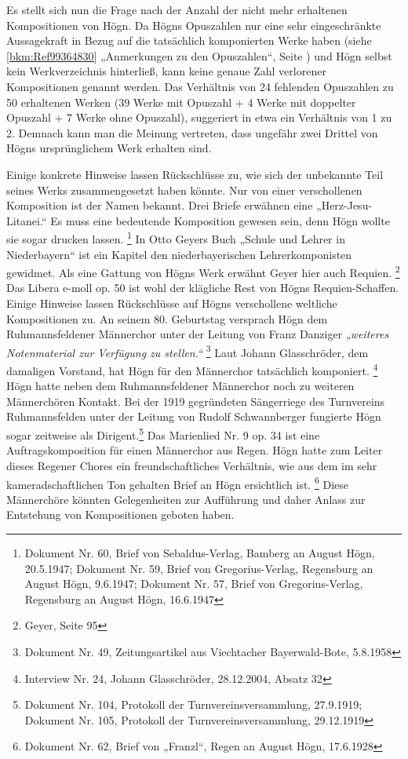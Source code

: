 \documentclass[a4paper]{article}
\newcommand\zitat[1]{\textit{#1}}
\begin{document}
Es stellt sich nun die Frage nach der Anzahl der nicht mehr erhaltenen
Kompositionen von Högn. Da Högns Opuszahlen nur eine sehr
eingeschränkte Aussagekraft in Bezug auf die tatsächlich komponierten
Werke haben (siehe \ref{bkm:Ref99364830} „Anmerkungen zu den
Opuszahlen“, Seite \pageref{bkm:Ref98509933}) und Högn selbst kein
Werkverzeichnis hinterließ, kann keine genaue Zahl verlorener
Kompositionen genannt werden. Das Verhältnis von 24 fehlenden
Opuszahlen zu 50 erhaltenen Werken (39 Werke mit Opuszahl + 4 Werke mit
doppelter Opuszahl + 7 Werke ohne Opuszahl), suggeriert in etwa ein
Verhältnis von 1 zu 2. Demnach kann man die Meinung vertreten, dass
ungefähr zwei Drittel von Högns ursprünglichem Werk erhalten sind.

Einige konkrete Hinweise lassen Rückschlüsse zu, wie sich der unbekannte
Teil seines Werks zusammengesetzt haben könnte. Nur von einer
verschollenen Komposition ist der Namen bekannt. Drei Briefe erwähnen
eine „Herz-Jesu-Litanei.“ Es muss eine bedeutende Komposition gewesen
sein, denn Högn wollte sie sogar drucken lassen.
\footnote{Dokument Nr. 60, Brief von Sebaldus-Verlag, Bamberg an August Högn, 20.5.1947;
Dokument Nr. 59, Brief von Gregorius-Verlag, Regensburg an August Högn, 9.6.1947;
Dokument Nr. 57, Brief von Gregorius-Verlag, Regensburg an August Högn, 16.6.1947}
In Otto
Geyers Buch „Schule und Lehrer in Niederbayern“ ist ein Kapitel den
niederbayerischen Lehrerkomponisten gewidmet. Als eine Gattung von
Högns Werk erwähnt Geyer hier auch Requien. \footnote{Geyer, Seite 95}
Das Libera e-moll op. 50 ist wohl der klägliche Rest von Högns
Requien-Schaffen. Einige Hinweise lassen Rückschlüsse auf Högns
verschollene weltliche Kompositionen zu. An seinem 80. Geburtstag
versprach Högn dem Ruhmannsfeldener Männerchor unter der Leitung von
Franz Danziger \zitat{„weiteres Notenmaterial zur Verfügung
zu stellen.“ } \footnote{Dokument Nr. 49, Zeitungsartikel aus
Viechtacher Bayerwald-Bote, 5.8.1958} Laut Johann Glasschröder, dem
damaligen Vorstand, hat Högn für den Männerchor tatsächlich
komponiert. \footnote{Interview Nr. 24, Johann Glasschröder,
28.12.2004, Absatz 32} Högn hatte neben dem Ruhmannsfeldener Männerchor
noch zu weiteren Männerchören Kontakt. Bei der 1919 gegründeten
Sängerriege des Turnvereins Ruhmannsfelden unter der Leitung von Rudolf
Schwannberger fungierte Högn sogar zeitweise als Dirigent.\footnote{
Dokument Nr. 104, Protokoll der Turnvereinsversammlung, 27.9.1919;
Dokument Nr. 105, Protokoll der Turnvereinsversammlung, 29.12.1919} Das
Marienlied Nr. 9 op. 34 ist eine Auftragskomposition für einen
Männerchor aus Regen. Högn hatte zum Leiter dieses Regener Chores ein
freundschaftliches Verhältnis, wie aus dem im sehr kameradschaftlichen
Ton gehalten Brief an Högn ersichtlich ist. \footnote{Dokument Nr. 62,
Brief von „Franzl“, Regen an August Högn, 17.6.1928} Diese Männerchöre
könnten Gelegenheiten zur Aufführung und daher Anlass zur Entstehung
von Kompositionen geboten haben.
\end{document}
